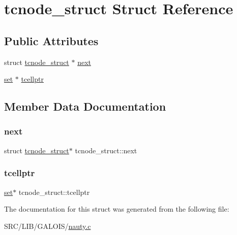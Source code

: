\hypertarget{structtcnode__struct}{}\section{tcnode\+\_\+struct Struct Reference}
\label{structtcnode__struct}
\subsection*{Public Attributes}
\begin{DoxyCompactItemize}
\item 
struct \mbox{\hyperlink{structtcnode__struct}{tcnode\+\_\+struct}} $\ast$ \mbox{\hyperlink{structtcnode__struct_ac202606469d841a0b042ddde58224620}{next}}
\item 
\mbox{\hyperlink{nauty_8h_a9690bea211101f22a5e154087590c3da}{set}} $\ast$ \mbox{\hyperlink{structtcnode__struct_a71faa1623910d0c22e9124b0e703d8e6}{tcellptr}}
\end{DoxyCompactItemize}


\subsection{Member Data Documentation}
\mbox{\label{structtcnode__struct_ac202606469d841a0b042ddde58224620}} 
\subsubsection{\texorpdfstring{next}{next}}
{\footnotesize\ttfamily struct \mbox{\hyperlink{structtcnode__struct}{tcnode\+\_\+struct}}$\ast$ tcnode\+\_\+struct\+::next}

\mbox{\label{structtcnode__struct_a71faa1623910d0c22e9124b0e703d8e6}} 
\subsubsection{\texorpdfstring{tcellptr}{tcellptr}}
{\footnotesize\ttfamily \mbox{\hyperlink{nauty_8h_a9690bea211101f22a5e154087590c3da}{set}}$\ast$ tcnode\+\_\+struct\+::tcellptr}



The documentation for this struct was generated from the following file\+:\begin{DoxyCompactItemize}
\item 
S\+R\+C/\+L\+I\+B/\+G\+A\+L\+O\+I\+S/\mbox{\hyperlink{_l_i_b_2_g_a_l_o_i_s_2nauty_8_c}{nauty.\+c}}\end{DoxyCompactItemize}
